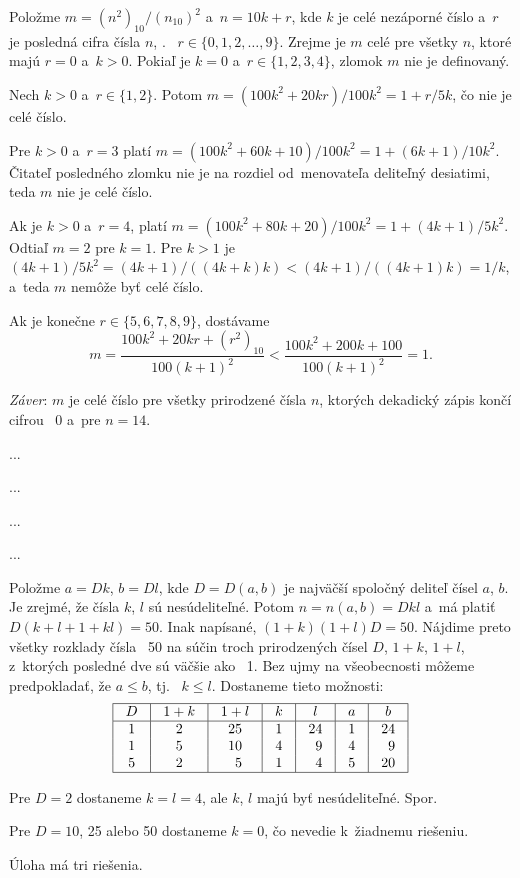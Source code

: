{%
 Položme $m=(n^{2})_{10}/(n_{10})^{2}$ a~$n=10k+r$, kde
$k$ je celé nezáporné číslo a~$r$ je posledná cifra čísla $n$, \tj.~ $r
\in \{0, 1, 2,\dots, 9\}$. Zrejme je $m$ celé pre všetky $n$,
ktoré majú $r=0$ a~$k > 0$. Pokiaľ je $k=0$ a~$r \in \{1, 2,
3, 4\}$, zlomok $m$ nie je definovaný.

 Nech $k > 0$ a~$r \in \{1, 2\}$. Potom $m=(100k^{2}+20kr)/100k^{2} =1+r/5k$, čo nie je celé číslo.

 Pre $k > 0$ a~$r=3$ platí $m=(100k^{2}+60k+10)/100k^{2}=1+(6k+1)/10k^{2}$. Čitateľ posledného zlomku nie je na rozdiel od~menovateľa deliteľný desiatimi, teda $m$ nie je celé číslo.

 Ak je $k > 0$ a~$r=4$, platí $m=(100k^{2}+80k+20)/100k^{2}=1+(4k+1)/5k^{2}$. Odtiaľ $m=2$ pre $k=1$. Pre $k > 1$ je
$(4k+1)/5k^{2} =(4k+1)/((4k+k)k) < (4k+1)/((4k+1)k) =1/k$, a~teda
 $m$ nemôže byť celé číslo.

 Ak je konečne $r \in \{5, 6, 7, 8, 9\}$, dostávame
$$
m=\frac{100k^{2}+20kr+(r^{2})_{10}}{100(k+1)^{2}} <
\frac{100k^{2}+200k+100}{100(k+1)^{2}} =1.
$$

{\it Záver\/}: $m$ je celé číslo pre všetky prirodzené čísla $n$,
ktorých dekadický zápis končí cifrou~ 0 a~pre $n=14$.
}

{%
...}

{%
...}

{%
...}

{%
...}

{%
Položme $a = Dk$, $b= Dl$, kde $D = D(a,b)$ je najväčší
spoločný deliteľ čísel $a$, $b$. Je zrejmé, že čísla $k$, $l$
sú nesúdeliteľné. Potom
$n= n(a,b) = Dkl$ a~má platiť $D(k+ l+ 1 + kl) = 50$. Inak napísané,
$(1 + k)(1 + l)D= 50$. Nájdime preto všetky rozklady čísla~ 50 na
súčin troch prirodzených čísel $D$, $1+k$, $1+l$, z~ktorých posledné
dve sú väčšie ako~ 1. Bez ujmy na všeobecnosti môžeme predpokladať,
že $a\le b$, tj.~ $k\le l$. Dostaneme tieto možnosti:
$$
\vbox{\offinterlineskip\def\enspace{\hskip.9em\relax}
\let\par\cr
\halign{\strut\vrule#&&\hss\enspace$#$\enspace\hss\vrule\cr
\noalign{\hrule}%
&D &1+k& 1+l& k& l &a &b\cr
\noalign{\hrule}%
& 1& 2 & 25 &1 &24 &1 &24\cr
& 1& 5 & 10 &4 &{\phantom0}9 &4 &{\phantom0}9\cr
& 5& 2 & {\phantom0}5 &1 &{\phantom0}4 &5 &20\cr
\noalign{\hrule}}}
$$

Pre $D= 2$ dostaneme $k= l= 4$, ale $k$, $l$ majú byť nesúdeliteľné. Spor.

Pre $D = 10$, 25 alebo 50 dostaneme $k= 0$, čo nevedie
k~žiadnemu riešeniu.

Úloha má tri riešenia.
}


